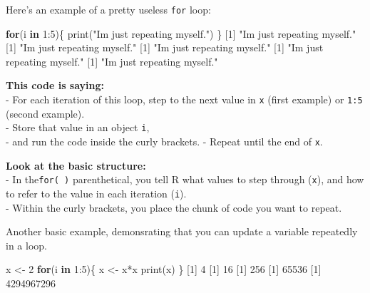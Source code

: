 \documentclass[
]{book}
\newenvironment{Shaded}{\begin{snugshade}}{\end{snugshade}}
\newcommand{\ControlFlowTok}[1]{\textcolor[rgb]{0.13,0.29,0.53}{\textbf{#1}}}
\newcommand{\DecValTok}[1]{\textcolor[rgb]{0.00,0.00,0.81}{#1}}
\newcommand{\FunctionTok}[1]{\textcolor[rgb]{0.00,0.00,0.00}{#1}}
\newcommand{\NormalTok}[1]{#1}
\newcommand{\OtherTok}[1]{\textcolor[rgb]{0.56,0.35,0.01}{#1}}
\newcommand{\SpecialCharTok}[1]{\textcolor[rgb]{0.00,0.00,0.00}{#1}}
\newcommand{\StringTok}[1]{\textcolor[rgb]{0.31,0.60,0.02}{#1}}
\begin{document}
Here's an example of a pretty useless \texttt{for} loop:

\begin{Shaded}
\begin{Highlighting}[]
\ControlFlowTok{for}\NormalTok{(i }\ControlFlowTok{in} \DecValTok{1}\SpecialCharTok{:}\DecValTok{5}\NormalTok{)\{}
  \FunctionTok{print}\NormalTok{(}\StringTok{"I\textquotesingle{}m just repeating myself."}\NormalTok{)}
\NormalTok{\}}
\NormalTok{[}\DecValTok{1}\NormalTok{] }\StringTok{"I\textquotesingle{}m just repeating myself."}
\NormalTok{[}\DecValTok{1}\NormalTok{] }\StringTok{"I\textquotesingle{}m just repeating myself."}
\NormalTok{[}\DecValTok{1}\NormalTok{] }\StringTok{"I\textquotesingle{}m just repeating myself."}
\NormalTok{[}\DecValTok{1}\NormalTok{] }\StringTok{"I\textquotesingle{}m just repeating myself."}
\NormalTok{[}\DecValTok{1}\NormalTok{] }\StringTok{"I\textquotesingle{}m just repeating myself."}
\end{Highlighting}
\end{Shaded}

\textbf{This code is saying:}\\
- For each iteration of this loop, step to the next value in \texttt{x} (first example) or \texttt{1:5} (second example).\\
- Store that value in an object \texttt{i},\\
- and run the code inside the curly brackets.
- Repeat until the end of \texttt{x}.

\textbf{Look at the basic structure:}\\
- In the\texttt{for(\ )} parenthetical, you tell R what values to step through (\texttt{x}), and how to refer to the value in each iteration (\texttt{i}).\\
- Within the curly brackets, you place the chunk of code you want to repeat.

Another basic example, demonsrating that you can update a variable repeatedly in a loop.

\begin{Shaded}
\begin{Highlighting}[]
\NormalTok{x }\OtherTok{\textless{}{-}} \DecValTok{2}
\ControlFlowTok{for}\NormalTok{(i }\ControlFlowTok{in} \DecValTok{1}\SpecialCharTok{:}\DecValTok{5}\NormalTok{)\{}
\NormalTok{  x }\OtherTok{\textless{}{-}}\NormalTok{ x}\SpecialCharTok{*}\NormalTok{x}
  \FunctionTok{print}\NormalTok{(x)}
\NormalTok{\}}
\NormalTok{[}\DecValTok{1}\NormalTok{] }\DecValTok{4}
\NormalTok{[}\DecValTok{1}\NormalTok{] }\DecValTok{16}
\NormalTok{[}\DecValTok{1}\NormalTok{] }\DecValTok{256}
\NormalTok{[}\DecValTok{1}\NormalTok{] }\DecValTok{65536}
\NormalTok{[}\DecValTok{1}\NormalTok{] }\DecValTok{4294967296}
\end{Highlighting}
\end{Shaded}
\end{document}
